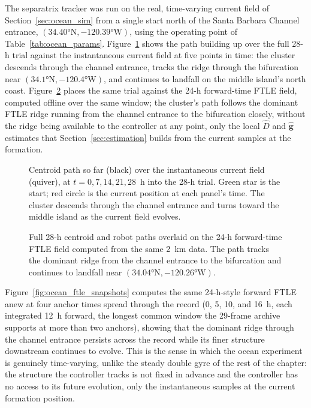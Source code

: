 \documentclass[12pt, letterpaper, oneside]{report}
\begin{document}
The separatrix tracker was run on the real, time-varying current field
of Section~\ref{sec:ocean_sim} from a single start north of the Santa
Barbara Channel entrance, $(34.40°\mathrm{N},
-120.39°\mathrm{W})$, using the operating point of
Table~\ref{tab:ocean_params}. Figure~\ref{fig:ocean_progression} shows the
path building up over the full 28-h trial against the instantaneous
current field at five points in time: the cluster descends through the
channel entrance, tracks the ridge through the bifurcation near
$(34.1°\mathrm{N}, -120.4°\mathrm{W})$, and continues to
landfall on the middle island's north coast. Figure~\ref{fig:ocean_ftle}
places the same trial against the 24-h forward-time FTLE field, computed
offline over the same window; the cluster's path
follows the dominant FTLE ridge running from the channel entrance to the
bifurcation closely, without the ridge being available to the controller
at any point, only the local $\hat{D}$ and $\hat{\mathbf{g}}$ estimates
that Section~\ref{sec:estimation} builds from the current samples at the
formation.

\begin{figure}[!t]
    \centering
    \framebox[0.9\linewidth]{\rule{0pt}{3.0cm}}
    \caption{Centroid path so far (black) over the instantaneous current
    field (quiver), at $t = 0, 7, 14, 21, 28$~h into the 28-h trial. Green
    star is the start; red circle is the current position at each panel's
    time. The cluster descends through the channel entrance and turns
    toward the middle island as the current field evolves.}
    \label{fig:ocean_progression}
\end{figure}

\begin{figure}[!t]
    \centering
    \framebox[0.9\linewidth]{\rule{0pt}{3.0cm}}
    \caption{Full 28-h centroid and robot paths overlaid on the 24-h
    forward-time FTLE field computed from the same 2~km data. The path
    tracks the dominant ridge from the channel entrance to the
    bifurcation and continues to landfall near
    $(34.04°\mathrm{N}, -120.26°\mathrm{W})$.}
    \label{fig:ocean_ftle}
\end{figure}

Figure~\ref{fig:ocean_ftle_snapshots} computes the same 24-h-style
forward FTLE anew at four anchor times spread through the record
(0, 5, 10, and 16~h, each integrated 12~h forward, the longest common
window the 29-frame archive supports at more than two anchors), showing
that the dominant ridge through the channel entrance persists across
the record while its finer structure downstream continues to evolve.
This is the sense in which the ocean experiment is genuinely
time-varying, unlike the steady double gyre of the rest of the chapter:
the structure the controller tracks is not fixed in advance and the
controller has no access to its future evolution, only the
instantaneous samples at the current formation position.
\end{document}
